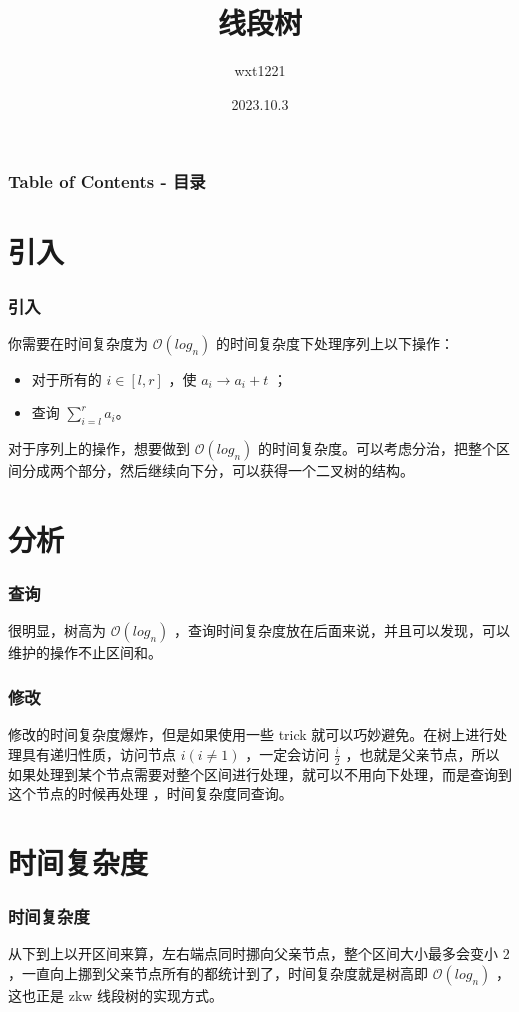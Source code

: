 \documentclass[UTF8]{ctexbeamer}
\author{wxt1221}
\date {2023.10.3}
\title{线段树}
\begin{document}
	\frame{\titlepage}
	\begin{frame}
		\frametitle{Table of Contents - 目录}
		\tableofcontents
	\end{frame}
	
	\section{引入}

	\begin{frame}
		
		\frametitle{引入}
		你需要在时间复杂度为 $\mathcal{O}(log_n)$ 的时间复杂度下处理序列上以下操作：
		\begin{itemize}
			\item 对于所有的 $i \in [l,r]$ ，使 $a_i \to a_i+t$ ；

			\item 查询 $\sum \limits _{i=l} ^{r} a_i$。

		\end{itemize}

		对于序列上的操作，想要做到 $\mathcal O(log_n)$ 的时间复杂度。可以考虑分治，把整个区间分成两个部分，然后继续向下分，可以获得一个二叉树的结构。
	\end{frame}

	\section{分析}
	\begin{frame}
		\frametitle{查询}
		很明显，树高为 $\mathcal O(log_n)$ ，查询时间复杂度放在后面来说，并且可以发现，可以维护的操作不止区间和。
	\end{frame}

	\begin{frame}
		\frametitle{修改}
		修改的时间复杂度爆炸，但是如果使用一些 trick 就可以巧妙避免。在树上进行处理具有递归性质，访问节点 $i(i \not= 1)$ ，一定会访问 $\frac i 2$ ，也就是父亲节点，所以如果处理到某个节点需要对整个区间进行处理，就可以不用向下处理，而是查询到这个节点的时候再处理 ，时间复杂度同查询。
	\end{frame}

	\section{时间复杂度}
	\begin{frame}
		\frametitle{时间复杂度}
		从下到上以开区间来算，左右端点同时挪向父亲节点，整个区间大小最多会变小 $2$ ，一直向上挪到父亲节点所有的都统计到了，时间复杂度就是树高即 $\mathcal O(log_n)$ ，这也正是 zkw 线段树的实现方式。
	\end{frame}
\end{document}
